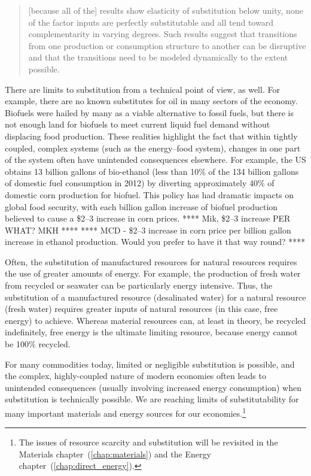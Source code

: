 \begin{quote}
	[because all of the] results show elasticity of substitution below unity, 
	none of the factor inputs are perfectly substitutable and 
	all tend toward complementarity in varying degrees. 
	Such results suggest that transitions 
	from one production or consumption structure to another 
	can be disruptive and that the transitions 
	need to be modeled dynamically to the extent possible.\cite[p.~8]{de-Wit:2013aa}
\end{quote}

There are limits to substitution from a technical point of view, as well.
For example, there are no known substitutes for oil 
in many sectors of the economy.\cite{Hirsch2005}
Biofuels were hailed by many as a viable alternative to fossil fuels, but
there is not enough land for biofuels to meet current liquid fuel demand
without displacing food production.
These realities highlight the fact that within tightly coupled, 
complex systems (such as the energy--food system), %
changes in one part of the system often have unintended consequences elsewhere.
For example, 
the US obtains 13 billion gallons of bio-ethanol 
(less than 10\% of the 134 billion gallons of domestic fuel consumption in 2012)
by diverting approximately 40\%
of domestic corn production for biofuel.\cite{EIA2014, USDA2014}
This policy has had dramatic impacts on global food security,
with each billion gallon increase of biofuel production believed to cause
a \$2--3 increase in corn prices.\cite{Kemick2013} 
**** Mik, \$2--3 increase PER WHAT? MKH ****
**** MCD - \$2--3 increase in corn price per billion gallon increase in ethanol production.
Would you prefer to have it that way round? ****

Often, the substitution of manufactured resources for natural resources
requires the use of greater amounts of energy.
For example, the production of fresh water from recycled or seawater
can be particularly energy intensive.
Thus, the substitution of a manufactured resource (desalinated water)
for a natural resource (fresh water)
requires greater inputs of natural resources (in this case, free energy) to achieve.
Whereas material resources can, at least in theory,
be recycled indefinitely,
free energy is the ultimate limiting resource, 
because energy cannot be 100\% recycled.

For many commodities today, limited or negligible substitution is possible,
and the complex, highly-coupled nature of modern economies
often leads to unintended consequences (usually involving increased energy consumption)
when substitution is technically possible.
We are reaching limits of substitutability for many important 
materials and energy sources for our 
economies.\footnote{The issues of resource scarcity and substitution
	will be revisited in 
	the Materials chapter~(\ref{chap:materials}) and
	the Energy chapter~(\ref{chap:direct_energy}).}


